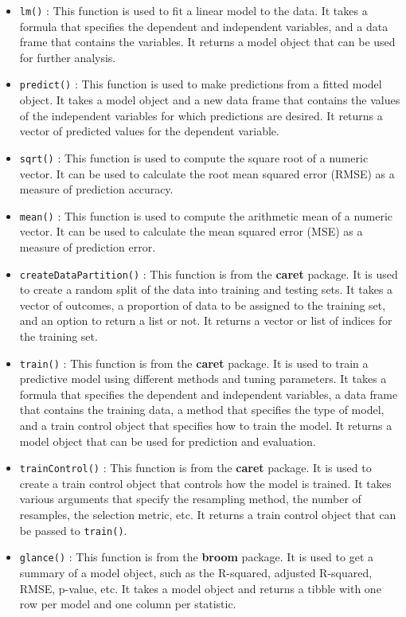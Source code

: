 \documentclass[
]{book}
\providecommand{\tightlist}{%
  \setlength{\itemsep}{0pt}\setlength{\parskip}{0pt}}
\begin{document}
\begin{itemize}
\tightlist
\item
  \texttt{lm()} : This function is used to fit a linear model to the data. It takes a formula that specifies the dependent and independent variables, and a data frame that contains the variables. It returns a model object that can be used for further analysis.
\item
  \texttt{predict()} : This function is used to make predictions from a fitted model object. It takes a model object and a new data frame that contains the values of the independent variables for which predictions are desired. It returns a vector of predicted values for the dependent variable.
\item
  \texttt{sqrt()} : This function is used to compute the square root of a numeric vector. It can be used to calculate the root mean squared error (RMSE) as a measure of prediction accuracy.
\item
  \texttt{mean()} : This function is used to compute the arithmetic mean of a numeric vector. It can be used to calculate the mean squared error (MSE) as a measure of prediction error.
\item
  \texttt{createDataPartition()} : This function is from the \textbf{caret} package. It is used to create a random split of the data into training and testing sets. It takes a vector of outcomes, a proportion of data to be assigned to the training set, and an option to return a list or not. It returns a vector or list of indices for the training set.
\item
  \texttt{train()} : This function is from the \textbf{caret} package. It is used to train a predictive model using different methods and tuning parameters. It takes a formula that specifies the dependent and independent variables, a data frame that contains the training data, a method that specifies the type of model, and a train control object that specifies how to train the model. It returns a model object that can be used for prediction and evaluation.
\item
  \texttt{trainControl()} : This function is from the \textbf{caret} package. It is used to create a train control object that controls how the model is trained. It takes various arguments that specify the resampling method, the number of resamples, the selection metric, etc. It returns a train control object that can be passed to \texttt{train()}.
\item
  \texttt{glance()} : This function is from the \textbf{broom} package. It is used to get a summary of a model object, such as the R-squared, adjusted R-squared, RMSE, p-value, etc. It takes a model object and returns a tibble with one row per model and one column per statistic.

\end{itemize}
\end{document}
